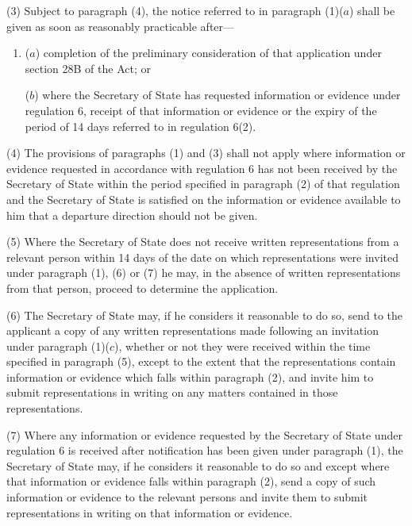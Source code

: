 \documentclass[a4paper]{article}
\begin{document}
(3) Subject to paragraph (4), the notice referred to in paragraph (1)($a$) shall
be given as soon as reasonably practicable after—
\begin{enumerate}\item[]
($a$) completion of the preliminary consideration of that application under section
28B of the Act; or

($b$) where the Secretary of State has requested information or evidence under
regulation 6, receipt of that information or evidence or the expiry of the
period of 14 days referred to in regulation 6(2).
\end{enumerate}

(4) The provisions of paragraphs (1) and (3) shall not apply where information
or evidence requested in accordance with regulation 6 has not been received by
the Secretary of State within the period specified in paragraph (2) of that
regulation and the Secretary of State is satisfied on the information or
evidence available to him that a departure direction should not be given.

(5) Where the Secretary of State does not receive written representations from a
relevant person within 14 days of the date on which representations were invited
under paragraph (1), (6) or (7) he may, in the absence of written
representations from that person, proceed to determine the application.

(6) The Secretary of State may, if he considers it reasonable to do so, send to
the applicant a copy of any written representations made following an invitation
under paragraph (1)($c$), whether or not they were received within the time
specified in paragraph (5), except to the extent that the representations
contain information or evidence which falls within paragraph (2), and invite him
to submit representations in writing on any matters contained in those
representations.

(7) Where any information or evidence requested by the Secretary of State under
regulation 6 is received after notification has been given under paragraph (1),
the Secretary of State may, if he considers it reasonable to do so and except
where that information or evidence falls within paragraph (2), send a copy of
such information or evidence to the relevant persons and invite them to submit
representations in writing on that information or evidence.
\end{document}

